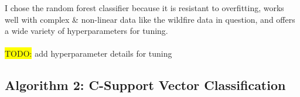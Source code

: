 \documentclass[a4paper]{article}
\begin{document}
I chose the random forest classifier because it is resistant to overfitting, works well with complex \& non-linear data like the wildfire data in question, and offers a wide variety of hyperparameters for tuning.
\\\\
\colorbox{yellow}{TODO:} add hyperparameter details for tuning

%


\subsection{Algorithm 2: C-Support Vector Classification}

\end{document}
